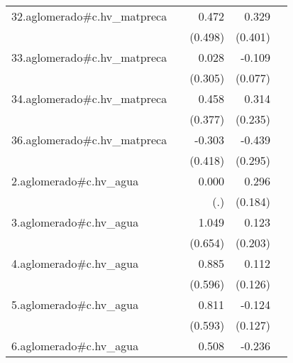{\begin{longtable}{l*{4}{D{.}{.}{-1}}}
\addlinespace
32.aglomerado#c.hv\_matpreca&                     &       0.472         &       0.329         &                     \\
            &                     &     (0.498)         &     (0.401)         &                     \\
\addlinespace
33.aglomerado#c.hv\_matpreca&                     &       0.028         &      -0.109         &                     \\
            &                     &     (0.305)         &     (0.077)         &                     \\
\addlinespace
34.aglomerado#c.hv\_matpreca&                     &       0.458         &       0.314         &                     \\
            &                     &     (0.377)         &     (0.235)         &                     \\
\addlinespace
36.aglomerado#c.hv\_matpreca&                     &      -0.303         &      -0.439         &                     \\
            &                     &     (0.418)         &     (0.295)         &                     \\
\addlinespace
2.aglomerado#c.hv\_agua&                     &       0.000         &       0.296         &                     \\
            &                     &         (.)         &     (0.184)         &                     \\
\addlinespace
3.aglomerado#c.hv\_agua&                     &       1.049         &       0.123         &                     \\
            &                     &     (0.654)         &     (0.203)         &                     \\
\addlinespace
4.aglomerado#c.hv\_agua&                     &       0.885         &       0.112         &                     \\
            &                     &     (0.596)         &     (0.126)         &                     \\
\addlinespace
5.aglomerado#c.hv\_agua&                     &       0.811         &      -0.124         &                     \\
            &                     &     (0.593)         &     (0.127)         &                     \\
\addlinespace
6.aglomerado#c.hv\_agua&                     &       0.508         &      -0.236         &                     \\

\end{longtable}}
